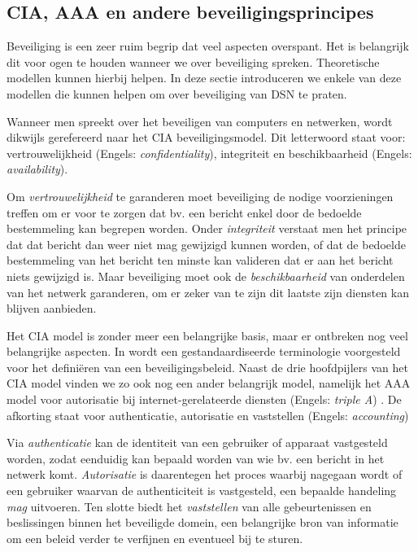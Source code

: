 \subsection{CIA, AAA en andere beveiligingsprincipes}
\label{subsection:cia}

Beveiliging is een zeer ruim begrip dat veel aspecten overspant. Het is
belangrijk dit voor ogen te houden wanneer we over beveiliging spreken.
Theoretische modellen kunnen hierbij helpen. In deze sectie introduceren we
enkele van deze modellen die kunnen helpen om over beveiliging van DSN te
praten.

Wanneer men spreekt over het beveiligen van computers en netwerken, wordt
dikwijls gerefereerd naar het CIA beveiligingsmodel. Dit letterwoord staat
voor: vertrouwelijkheid (Engels: \emph{confidentiality}), integriteit en
beschikbaarheid (Engels: \emph{availability}).

Om \emph{vertrouwelijkheid} te garanderen moet beveiliging de nodige
voorzieningen treffen om er voor te zorgen dat bv. een bericht enkel door de
bedoelde bestemmeling kan begrepen worden. Onder \emph{integriteit} verstaat
men het principe dat dat bericht dan weer niet mag gewijzigd kunnen worden, of
dat de bedoelde bestemmeling van het bericht ten minste kan valideren dat er
aan het bericht niets gewijzigd is. Maar beveiliging moet ook de
\emph{beschikbaarheid} van onderdelen van het netwerk garanderen, om er zeker
van te zijn dit laatste zijn diensten kan blijven aanbieden.

Het CIA model is zonder meer een belangrijke basis, maar er ontbreken nog veel
belangrijke aspecten. In \citep{rfc:3198} wordt een gestandaardiseerde
terminologie voorgesteld voor het defini\"eren van een beveiligingsbeleid.
Naast de drie hoofdpijlers van het CIA model vinden we zo ook nog een ander
belangrijk model, namelijk het AAA model voor autorisatie bij
internet-gerelateerde diensten (Engels: \emph{triple A}) \citep{rfc:2904}. De
afkorting staat voor authenticatie, autorisatie en vaststellen (Engels:
\emph{accounting})

Via \emph{authenticatie} kan de identiteit van een gebruiker of apparaat
vastgesteld worden, zodat eenduidig kan bepaald worden van wie bv. een bericht
in het netwerk komt. \emph{Autorisatie} is daarentegen het proces waarbij
nagegaan wordt of een gebruiker waarvan de authenticiteit is vastgesteld, een
bepaalde handeling \emph{mag} uitvoeren. Ten slotte biedt het
\emph{vaststellen} van alle gebeurtenissen en beslissingen binnen het
beveiligde domein, een belangrijke bron van informatie om een beleid verder te
verfijnen en eventueel bij te sturen.


